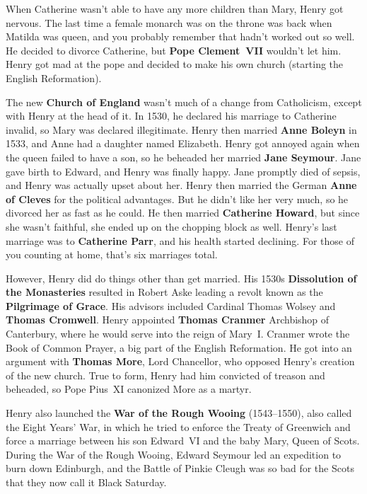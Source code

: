When Catherine wasn't able to have any more children than Mary, Henry got nervous.
The last time a female monarch was on the throne was back when Matilda was queen,
and you probably remember that hadn't worked out so well.
He decided to divorce Catherine, but \textbf{Pope Clement~VII} wouldn't let him.
Henry got mad at the pope and decided to make his own church (starting the English Reformation).

The new \textbf{Church of England} wasn't much of a change from Catholicism, except with Henry at the head of it.
In 1530, he declared his marriage to Catherine invalid, so Mary was declared illegitimate.
Henry then married \textbf{Anne Boleyn} in 1533, and Anne had a daughter named Elizabeth.
Henry got annoyed again when the queen failed to have a son, so he beheaded her married \textbf{Jane Seymour}.
Jane gave birth to Edward, and Henry was finally happy.
Jane promptly died of sepsis, and Henry was actually upset about her.
Henry then married the German \textbf{Anne of Cleves} for the political advantages.
But he didn't like her very much, so he divorced her as fast as he could.
He then married \textbf{Catherine Howard}, but since she wasn't faithful,
she ended up on the chopping block as well.
Henry's last marriage was to \textbf{Catherine Parr}, and his health started declining.
For those of you counting at home, that's six marriages total.

However, Henry did do things other than get married.
His 1530s \textbf{Dissolution of the Monasteries} resulted in
Robert Aske leading a revolt known as the \textbf{Pilgrimage of Grace}.
His advisors included Cardinal Thomas Wolsey and \textbf{Thomas Cromwell}.
Henry appointed \textbf{Thomas Cranmer} Archbishop of Canterbury,
where he would serve into the reign of Mary~I.
Cranmer wrote the Book of Common Prayer, a big part of the English Reformation.
He got into an argument with \textbf{Thomas More}, Lord Chancellor, who opposed Henry's creation of the new church.
True to form, Henry had him convicted of treason and beheaded, so Pope Pius~XI canonized More as a martyr.

Henry also launched the \textbf{War of the Rough Wooing} (1543--1550), also called the Eight Years' War,
in which he tried to enforce the Treaty of Greenwich
and force a marriage between his son Edward~VI and the baby Mary, Queen of Scots.
During the War of the Rough Wooing, Edward Seymour led an expedition to burn down Edinburgh,
and the Battle of Pinkie Cleugh was so bad for the Scots that they now call it Black Saturday.

